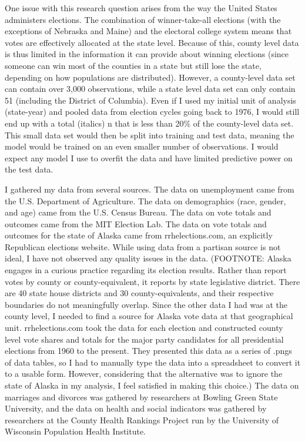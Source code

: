 \documentclass[11pt]{article}
\begin{document}
    One issue with this research question arises from the way the United
States administers elections. The combination of winner-take-all
elections (with the exceptions of Nebraska and Maine) and the electoral
college system means that votes are effectively allocated at the state
level. Because of this, county level data is thus limited in the
information it can provide about winning elections (since someone can
win most of the counties in a state but still lose the state, depending
on how populations are distributed). However, a county-level data set
can contain over 3,000 observations, while a state level data set can
only contain 51 (including the District of Columbia). Even if I used my
initial unit of analysis (state-year) and pooled data from election
cycles going back to 1976, I would still end up with a total (italics) n
that is less than 20\% of the county-level data set. This small data set
would then be split into training and test data, meaning the model would
be trained on an even smaller number of observations. I would expect any
model I use to overfit the data and have limited predictive power on the
test data.

    I gathered my data from several sources. The data on unemployment came
from the U.S. Department of Agriculture. The data on demographics (race,
gender, and age) came from the U.S. Census Bureau. The data on vote
totals and outcomes came from the MIT Election Lab. The data on vote
totals and outcomes for the state of Alaska came from rrhelections.com,
an explicitly Republican elections website. While using data from a
partisan source is not ideal, I have not observed any quality issues in
the data. (FOOTNOTE: Alaska engages in a curious practice regarding its
election results. Rather than report votes by county or
county-equivalent, it reports by state legislative district. There are
40 state house districts and 30 county-equivalents, and their respective
boundaries do not meaningfully overlap. Since the other data I had was
at the county level, I needed to find a source for Alaska vote data at
that geographical unit. rrhelections.com took the data for each election
and constructed county level vote shares and totals for the major party
candidates for all presidential elections from 1960 to the present. They
presented this data as a series of .pngs of data tables, so I had to
manually type the data into a spreadsheet to convert it to a usable
form. However, considering that the alternative was to ignore the state
of Alaska in my analysis, I feel satisfied in making this choice.) The
data on marriages and divorces was gathered by researchers at Bowling
Green State University, and the data on health and social indicators was
gathered by researchers at the County Health Rankings Project run by the
University of Wisconsin Population Health Institute.
\end{document}
